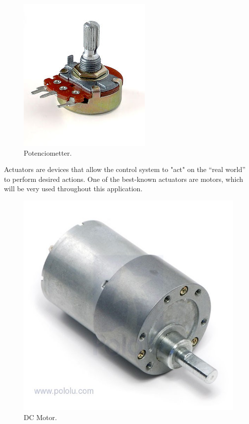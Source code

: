 \begin{center}
	\begin{figure}[H]
		\center
		\includegraphics[scale=0.4]{imagenes/EstadoArte/potentiometer.jpg}
		\caption{Potenciometter.}
		\label{fig:potentiometer}
	\end{figure}
\end{center}

Actuators are devices that allow the control system to "act" on the “real world” to perform desired actions. One of the best-known actuators are motors, which will be very used throughout this application.  \newline

\begin{center}
	\begin{figure}[H]
		\center
		\includegraphics[scale=0.4]{imagenes/EstadoArte/motor.jpg}
		\caption{DC Motor.}
		\label{fig:motor_DC}
	\end{figure}
\end{center}


